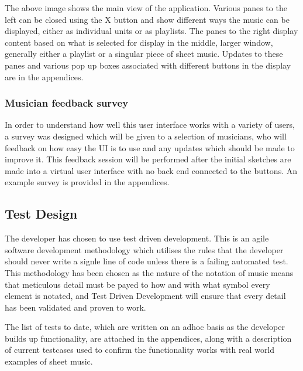 The above image shows the main view of the application. Various panes to the left can be closed using the X button and show different ways the music can be displayed, either as individual units or as playlists. The panes to the right display content based on what is selected for display in the middle, larger window, generally either a playlist or a singular piece of sheet music. Updates to these panes and various pop up boxes associated with different buttons in the display are in the appendices.
\subsubsection{Musician feedback survey}
In order to understand how well this user interface works with a variety of users, a survey was designed which will be given to a selection of musicians, who will feedback on how easy the UI is to use and any updates which should be made to improve it. This feedback session will be performed after the initial sketches are made into a virtual user interface with no back end connected to the buttons. An example survey is provided in the appendices.
\subsection{Test Design}
The developer has chosen to use test driven development. This is an agile software development methodology which utilises the rules that the developer should never write a signle line of code unless there is a failing automated test\parencite{TDD}. This methodology has been chosen as the nature of the notation of music means that meticulous detail must be payed to how and with what symbol every element is notated, and Test Driven Development will ensure that every detail has been validated and proven to work.

The list of tests to date, which are written on an adhoc basis as the developer builds up functionality, are attached in the appendices, along with a description of current testcases used to confirm the functionality works with real world examples of sheet music.